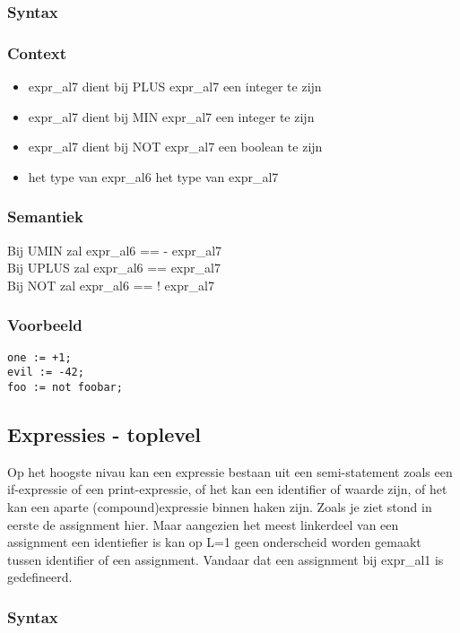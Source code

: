 \documentclass[]{article}
\begin{document}
\subsubsection{Syntax}

\subsubsection{Context}
\begin{itemize}
\item expr\_al7 dient bij PLUS expr\_al7 een integer te zijn
\item expr\_al7 dient bij MIN expr\_al7 een integer te zijn
\item expr\_al7 dient bij NOT expr\_al7 een boolean te zijn
\item het type van expr\_al6 het type van expr\_al7
\end{itemize}
\subsubsection{Semantiek}
Bij UMIN zal expr\_al6 == - expr\_al7 \\
Bij UPLUS zal expr\_al6 == expr\_al7 \\
Bij NOT zal expr\_al6 == ! expr\_al7 
\subsubsection{Voorbeeld}
\begin{lstlisting}[style=SELMA]
one := +1;
evil := -42;
foo := not foobar;
\end{lstlisting}

\subsection{Expressies - toplevel}
Op het hoogste nivau kan een expressie bestaan uit een semi-statement zoals een if-expressie of een print-expressie, of het kan een identifier of waarde zijn, of het kan een aparte (compound)expressie binnen haken zijn.
Zoals je ziet stond in eerste de assignment hier. Maar aangezien het meest linkerdeel van een assignment een identiefier is kan op L=1 geen onderscheid worden gemaakt tussen identifier of een assignment. Vandaar dat een assignment bij expr\_al1 is gedefineerd.
\subsubsection{Syntax}

\end{document}
